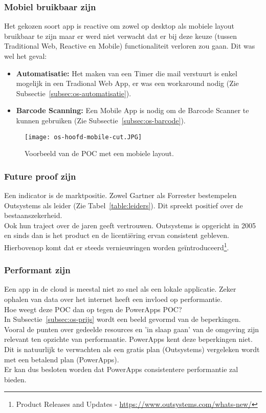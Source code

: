 \subsubsection{Mobiel bruikbaar zijn}

Het gekozen soort app is reactive om zowel op desktop als mobiele layout bruikbaar te zijn maar er werd niet verwacht dat er bij deze keuze (tussen Traditional Web, Reactive en Mobile) functionaliteit verloren zou gaan. Dit was wel het geval:
\begin{itemize}
    \item \textbf{Automatisatie:} Het maken van een Timer die mail verstuurt is enkel mogelijk in een Tradional Web App, er was een workaround nodig (Zie Subsectie~\ref{subsec:os-automatisatie}).
    \item \textbf{Barcode Scanning:} Een Mobile App is nodig om de Barcode Scanner te kunnen gebruiken (Zie Subsectie~\ref{subsec:os-barcode}).
\end{itemize}

\begin{figure}[h!]
    \centering
    \texttt{[image: os-hoofd-mobile-cut.JPG]}
    \caption{Voorbeeld van de POC met een mobiele layout.}
    \label{fig:os-hoofd-mobile}
\end{figure}

\subsubsection{Future proof zijn}

Een indicator is de marktpositie. Zowel Gartner als Forrester bestempelen Outsystems als leider (Zie Tabel~\ref{table:leiders}). Dit spreekt positief over de bestaanszekerheid.\\
Ook hun traject over de jaren geeft vertrouwen.
Outsystems is opgericht in 2005 en sinds dan is het product en de licentiëring ervan consistent gebleven.\\
Hierbovenop komt dat er steeds vernieuwingen worden geïntroduceerd\footnote{Product Releases and Updates - \url{https://www.outsystems.com/whats-new/}}.

\subsubsection{Performant zijn}

Een app in de cloud is meestal niet zo snel als een lokale applicatie. Zeker ophalen van data over het internet heeft een invloed op performantie.\\
Hoe weegt deze POC dan op tegen de PowerApps POC?\\
In Subsectie~\ref{subsec:os-prijs} wordt een beeld gevormd van de beperkingen. Vooral de punten over gedeelde resources en 'in slaap gaan' van de omgeving zijn relevant ten opzichte van performantie. PowerApps kent deze beperkingen niet. Dit is natuurlijk te verwachten als een gratis plan (Outsystems) vergeleken wordt met een betalend plan (PowerApps).\\
Er kan dus besloten worden dat PowerApps consistentere performantie zal bieden.

